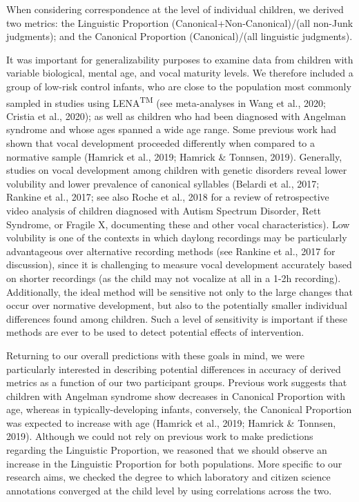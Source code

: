\documentclass[english,,man]{apa6}
\begin{document}
When considering correspondence at the level of individual children, we derived two metrics: the Linguistic Proportion (Canonical+Non-Canonical)/(all non-Junk judgments); and the Canonical Proportion (Canonical)/(all linguistic judgments).

It was important for generalizability purposes to examine data from children with variable biological, mental age, and vocal maturity levels. We therefore included a group of low-risk control infants, who are close to the population most commonly sampled in studies using LENA\textsuperscript{TM} (see meta-analyses in Wang et al., 2020; Cristia et al., 2020); as well as children who had been diagnosed with Angelman syndrome and whose ages spanned a wide age range. Some previous work had shown that vocal development proceeded differently when compared to a normative sample (Hamrick et al., 2019; Hamrick \& Tonnsen, 2019). Generally, studies on vocal development among children with genetic disorders reveal lower volubility and lower prevalence of canonical syllables (Belardi et al., 2017; Rankine et al., 2017; see also Roche et al., 2018 for a review of retrospective video analysis of children diagnosed with Autism Spectrum Disorder, Rett Syndrome, or Fragile X, documenting these and other vocal characteristics). Low volubility is one of the contexts in which daylong recordings may be particularly advantageous over alternative recording methods (see Rankine et al., 2017 for discussion), since it is challenging to measure vocal development accurately based on shorter recordings (as the child may not vocalize at all in a 1-2h recording). Additionally, the ideal method will be sensitive not only to the large changes that occur over normative development, but also to the potentially smaller individual differences found among children. Such a level of sensitivity is important if these methods are ever to be used to detect potential effects of intervention.

Returning to our overall predictions with these goals in mind, we were particularly interested in describing potential differences in accuracy of derived metrics as a function of our two participant groups. Previous work suggests that children with Angelman syndrome show decreases in Canonical Proportion with age, whereas in typically-developing infants, conversely, the Canonical Proportion was expected to increase with age (Hamrick et al., 2019; Hamrick \& Tonnsen, 2019). Although we could not rely on previous work to make predictions regarding the Linguistic Proportion, we reasoned that we should observe an increase in the Linguistic Proportion for both populations. More specific to our research aims, we checked the degree to which laboratory and citizen science annotations converged at the child level by using correlations across the two.
\end{document}
